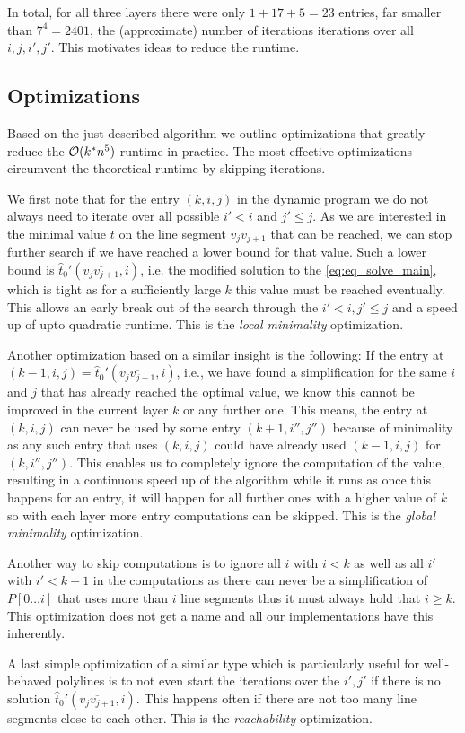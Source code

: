 In total, for all three layers there were only \(1 + 17 + 5 = 23\) entries, far smaller than \(7^4 = 2401\), the (approximate) number of iterations iterations over all \(i, j, i', j'\). This motivates ideas to reduce the runtime.

\subsection{Optimizations}
\label{ssec:optimizations}
Based on the just described algorithm we outline optimizations that greatly reduce the \(\mathcal{O}(k^*n^5)\) runtime in practice. The most effective optimizations circumvent the theoretical runtime by skipping iterations. 

We first note that for the entry \((k, i, j)\) in the dynamic program we do not always need to iterate over all possible \(i' < i\) and \(j' \leq j\). As we are interested in the minimal value \(t\) on the line segment \(\overline{v_{j}v_{j+1}}\) that can be reached, we can stop further search if we have reached a lower bound for that value. Such a lower bound is \(\hat t_0'(\overline{v_{j}v_{j+1}}, i)\), i.e. the modified solution to the \cref{eq:eq_solve_main}, which is tight as for a sufficiently large \(k\) this value must be reached eventually. This allows an early break out of the search through the \(i' < i, j'\leq j\) and a speed up of upto quadratic runtime. This is the \emph{local minimality} optimization. 

Another optimization based on a similar insight is the following: If the entry at \((k-1, i, j) = \hat t_0'(\overline{v_{j}v_{j+1}}, i)\), i.e., we have found a simplification for the same \(i\) and \(j\) that has already reached the optimal value, we know this cannot be improved in the current layer \(k\) or any further one. This means, the entry at \((k, i, j)\) can never be used by some entry \((k + 1, i'', j'')\) because of minimality as any such entry that uses \((k, i, j)\) could have already used \((k-1, i, j)\) for \((k, i'', j'')\). This enables us to completely ignore the computation of the value, resulting in a continuous speed up of the algorithm while it runs as once this happens for an entry, it will happen for all further ones with a higher value of \(k\) so with each layer more entry computations can be skipped. This is the \emph{global minimality} optimization.

Another way to skip computations is to ignore all \(i\) with \(i < k\) as well as all \(i'\) with \(i' < k - 1\) in the computations as there can never be a simplification of \(P[0\dots i]\) that uses more than \(i\) line segments thus it must always hold that \(i \geq k\). This optimization does not get a name and all our implementations have this inherently.

A last simple optimization of a similar type which is particularly useful for well-behaved polylines is to not even start the iterations over the \(i', j'\) if there is no solution \(\hat t_0'(\overline{v_{j}v_{j+1}}, i)\). This happens often if there are not too many line segments close to each other. This is the \emph{reachability} optimization. 



